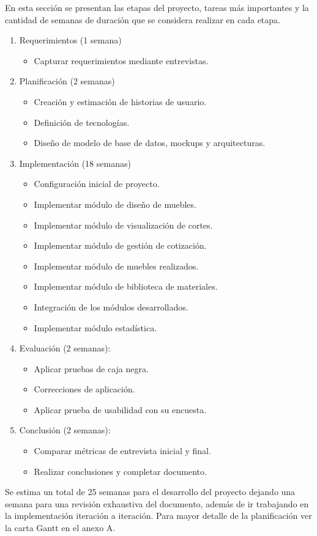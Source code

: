 ﻿\documentclass{iccmemoria}
\begin{document}
En esta sección se presentan las etapas del proyecto, tareas más importantes y la cantidad de semanas de duración que se considera realizar en cada etapa.
\begin{enumerate}
\item Requerimientos (1 semana)
    \begin{itemize}
        \item Capturar requerimientos mediante entrevistas.
    \end{itemize}

\item Planificación (2 semanas)
\begin{itemize}
    \item Creación y estimación de historias de usuario.
    \item Definición de tecnologías.
    \item Diseño de modelo de base de datos, mockups y arquitecturas.
\end{itemize}
    
\item Implementación (18 semanas)
\begin{itemize}
    \item Configuración inicial de proyecto.
    \item Implementar módulo de diseño de muebles.
    \item Implementar módulo de visualización de cortes.
    \item Implementar módulo de gestión de cotización.
    \item Implementar módulo de muebles realizados.
    \item Implementar módulo de biblioteca de materiales.
    \item Integración de los módulos desarrollados.
   \item  Implementar módulo estadística.
\end{itemize}

    
\item Evaluación (2 semanas):
\begin{itemize}
    \item Aplicar pruebas de caja negra.
    \item Correcciones de aplicación.
    \item Aplicar prueba de usabilidad con su encuesta.
\end{itemize}

 \item Conclusión (2 semanas):
 \begin{itemize}
    \item Comparar métricas de entrevista inicial y final.
    \item Realizar conclusiones y completar documento.
 \end{itemize}

\end{enumerate}
Se estima un total de 25 semanas para el desarrollo del proyecto dejando una semana para una revisión exhaustiva del documento, además de ir trabajando en la implementación iteración a iteración. Para mayor detalle de la planificación ver la carta Gantt en el anexo A.
\end{document}
